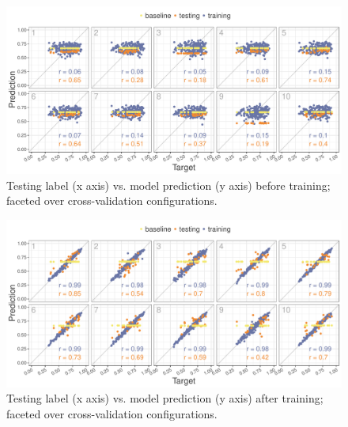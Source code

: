 \documentclass[11pt,a4paper]{article}
\begin{document}
\begin{figure}[!htb]
	\includegraphics[width=\linewidth]{graphs/all-pred-target-epoch1.pdf}
	\caption{Testing label (x axis) vs. model prediction (y axis) before training; faceted over cross-validation configurations.}
	\label{fig:app-corr-pretraining}
\end{figure}

\begin{figure}[!htb]
	\includegraphics[width=\linewidth]{graphs/all-pred-target-epoch30.pdf}
	\caption{Testing label (x axis) vs. model prediction (y axis) after training; faceted over cross-validation configurations.}
	\label{fig:app-corr-posttraining}
\end{figure}
\end{document}
